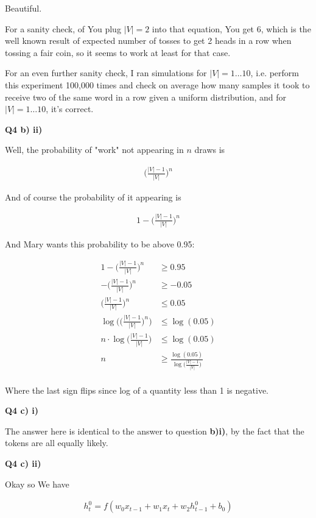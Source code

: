 \documentclass{article}
\begin{document}
	Beautiful. 
	
	For a sanity check, of You plug $|V|=2$ into that equation, You get 6, which is the well known result of expected number of tosses to get 2 heads in a row when tossing a fair coin, so it seems to work at least for that case.
	
	For an even further sanity check, I ran simulations for $|V|=1\ldots 10$, i.e. perform this experiment 100,000 times and check on average how many samples it took to receive two of the same word in a row given a uniform distribution, and for $|V|=1\ldots 10$, it's correct.
	
\textbf{Q4 b) ii)}

	Well, the probability of "work" not appearing in $n$ draws is
	
	\begin{align}
		\bigg( \frac{|V|-1}{|V|}\bigg)^n
	\end{align}
	
	And of course the probability of it appearing is
	
	\begin{align}
		1 - \bigg( \frac{|V|-1}{|V|}\bigg)^n
	\end{align}
	
	And Mary wants this probability to be above 0.95:

	\begin{align}
		1 - \bigg( \frac{|V|-1}{|V|}\bigg)^n &\ge 0.95\\
		- \bigg( \frac{|V|-1}{|V|}\bigg)^n &\ge -0.05\\
		\bigg( \frac{|V|-1}{|V|}\bigg)^n &\le 0.05\\
		\log\bigg(\bigg( \frac{|V|-1}{|V|}\bigg)^n\bigg) &\le \log(0.05)\\
		n\cdot\log\bigg( \frac{|V|-1}{|V|}\bigg) &\le \log(0.05)\\
		n &\ge \frac{\log(0.05)}{\log\big( \frac{|V|-1}{|V|}\big)}\\
	\end{align}
	
	Where the last sign flips since log of a quantity less than 1 is negative. 

\textbf{Q4 c) i)}

	The answer here is identical to the answer to question \textbf{b)i)}, by the fact that the tokens are all equally likely.
	
	
\textbf{Q4 c) ii)}

	Okay so We have
	
	\begin{align}
		h^0_t = f(w_0x_{t-1} + w_1 x_t + w_2h^0_{t-1} + b_0)
	\end{align}
	
\end{document}
